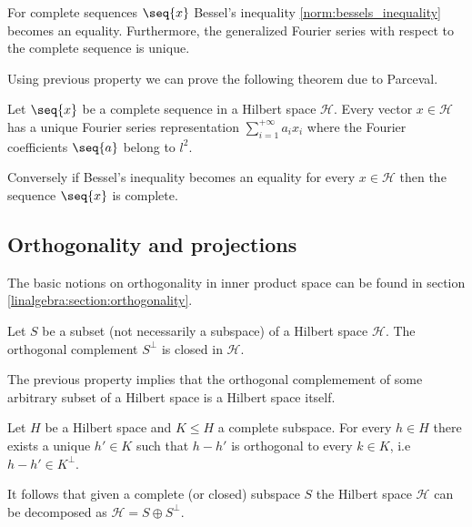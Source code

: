    \begin{property}
        For complete sequences $\seq{x}$ Bessel's inequality \ref{norm:bessels_inequality} becomes an equality. Furthermore, the generalized Fourier series with respect to the complete sequence is unique.
    \end{property}

    Using previous property we can prove the following theorem due to Parceval.
    \begin{theorem}[Parceval]
        Let $\seq{x}$ be a complete sequence in a Hilbert space $\mathcal{H}$. Every vector $x\in\mathcal{H}$ has a unique Fourier series representation $\sum_{i=1}^{+\infty}a_ix_i$ where the Fourier coefficients $\seq{a}$ belong to $l^2$.

        Conversely if Bessel's inequality becomes an equality for every $x\in\mathcal{H}$ then the sequence $\seq{x}$ is complete.
    \end{theorem}

\subsection{Orthogonality and projections}

    The basic notions on orthogonality in inner product space can be found in section \ref{linalgebra:section:orthogonality}.

    \begin{property}
        Let $S$ be a subset (not necessarily a subspace) of a Hilbert space $\mathcal{H}$. The orthogonal complement $S^\perp$ is closed in $\mathcal{H}$.
    \end{property}
    \begin{result}
        The previous property implies that the orthogonal complemement of some arbitrary subset of a Hilbert space is a Hilbert space itself.
    \end{result}

    \begin{theorem}
        \label{linalgebra:theorem:projection_theorem}
        Let $H$ be a Hilbert space and $K\leq H$ a complete subspace. For every $h\in H$ there exists a unique $h'\in K$ such that $h-h'$ is orthogonal to every $k\in K$, i.e $h-h'\in K^\perp$.
    \end{theorem}
    \begin{result}
        It follows that given a complete (or closed) subspace $S$ the Hilbert space $\mathcal{H}$ can be decomposed as $\mathcal{H} = S\oplus S^\perp$.
    \end{result}

